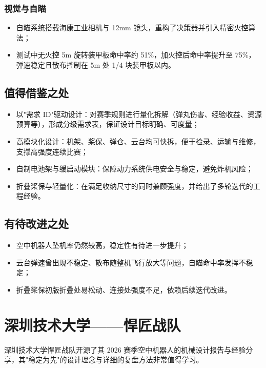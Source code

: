 \subsubsection{视觉与自瞄}
\begin{itemize}
    \item 自瞄系统搭载海康工业相机与 12mm 镜头，重构了决策器并引入精密火控算法；
    \item 测试中无火控 5m 旋转装甲板命中率约 51\%，加火控后命中率提升至 75\%，弹速稳定且散布控制在 5m 处 1/4 块装甲板以内。
\end{itemize}

\subsection{值得借鉴之处}
\begin{itemize}
    \item 以"需求 ID"驱动设计：对赛季规则进行量化拆解（弹丸伤害、经验收益、资源预算等），形成分级需求表，保证设计目标明确、可度量；
    \item 高模块化设计：机架、桨保、弹仓、云台均可快拆，便于检录、运输与维修，支撑高强度连续比赛；
    \item 自制电池架与缓启动模块：保障动力系统供电安全与稳定，避免炸机风险；
    \item 折叠桨保与轻量化：在满足收纳尺寸的同时兼顾强度，并给出了多轮迭代的工程经验。
\end{itemize}

\subsection{有待改进之处}
\begin{itemize}
    \item 空中机器人坠机率仍然较高，稳定性有待进一步提升；
    \item 云台弹速曾出现不稳定、散布随整机飞行放大等问题，自瞄命中率发挥不稳定；
    \item 折叠桨保初版折叠处易松动、连接处强度不足，依赖后续迭代改进。
\end{itemize}

\section{深圳技术大学——悍匠战队}

深圳技术大学悍匠战队开源了其 2026 赛季空中机器人的机械设计报告与经验分享\cite{sztu_hanjiang_drone_2026}，其"稳定为先"的设计理念与详细的复盘方法非常值得学习。

